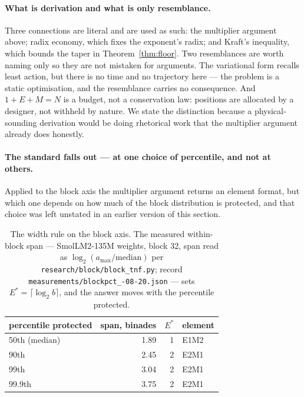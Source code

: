 \paragraph{What is derivation and what is only resemblance.} Three connections are
literal and are used as such: the multiplier argument above; radix economy, which
fixes the exponent's radix; and Kraft's inequality, which bounds the taper in
Theorem~\ref{thm:floor}. Two resemblances are worth naming only so they are not
mistaken for arguments. The variational form recalls least action, but there is no
time and no trajectory here --- the problem is a static optimisation, and the
resemblance carries no consequence. And $1+E+M=N$ is a budget, not a conservation
law: positions are allocated by a designer, not withheld by nature. We state the
distinction because a physical-sounding derivation would be doing rhetorical work
that the multiplier argument already does honestly.

\paragraph{The standard falls out --- at one choice of percentile, and not at
others.} Applied to the block axis the multiplier argument returns an element
format, but which one depends on how much of the block distribution is protected,
and that choice was left unstated in an earlier version of this section.

\begin{table}[t]\centering
\caption{The width rule on the block axis. The measured within-block span ---
SmolLM2-135M weights, block 32, span read as $\log_2(a_{\max}/\mathrm{median})$
per \texttt{research/\allowbreak block/\allowbreak block\_\allowbreak tnf.py}; record
\texttt{measurements/\allowbreak blockpct\_-08-20.json} --- sets
$E^{*} = \lceil \log_2 b \rceil$, and the answer moves with the percentile
protected.}
\label{tab:blockpct}
\begin{tabular}{lrrl}
\toprule
percentile protected & span, binades & $E^{*}$ & element \\
\midrule
50th (median) & 1.89 & 1 & E1M2 \\
90th & 2.45 & 2 & E2M1 \\
99th & 3.04 & 2 & E2M1 \\
99.9th & 3.75 & 2 & E2M1 \\
\bottomrule
\end{tabular}
\end{table}


